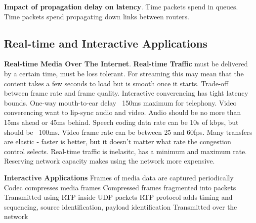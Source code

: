 \documentclass{article}
\begin{document}
\noindent \textbf{Impact of propagation delay on latency}.
Time packets spend in queues.
Time packets spend propagating down links between routers.


\subsection*{Real-time and Interactive Applications}

\noindent \textbf{Real-time Media Over The Internet}.
\textbf{Real-time Traffic} must be delivered by a certain time, must be loss tolerant.
For streaming this may mean that the content takes a few seconds to load but is smooth once it starts.
Trade-off between frame rate and frame quality.
Interactive converencing has tight latency bounds.
One-way mouth-to-ear delay ~150ms maximum for telephony.
Video converencing want to lip-sync audio and video.
Audio should be no more than 15ms ahead or 45ms behind.
Speech coding data rate can be 10s of kbps, but should be ~100ms.
Video frame rate can be between 25 and 60fps.
Many transfers are elastic - faster is better, but it doesn't matter what rate the congestion control selects.
Real-time traffic is inelasitc, has a minimum and maximum rate.
Reserving network capacity makes using the network more expensive.

\noindent \textbf{Interactive Applications}
Frames of media data are captured periodically
Codec compresses media frames
Compressed frames fragmented into packets
Transmitted using RTP inside UDP packets
RTP protocol adds timing and sequencing, source identification, payload identification
Transmitted over the network
\end{document}
